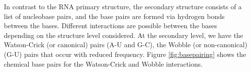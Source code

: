 In contrast to the RNA primary structure, the secondary structure consists of a list of nucleobase pairs, and the base pairs are formed via hydrogen bonds between the bases. Different interactions are possible between the bases depending on the structure level considered. At the secondary level, we have the Watson-Crick (or canonical) pairs \cite{seeman1976rna, rosenberg1976rna} (A-U and G-C), the Wobble (or non-canonical) (G-U) pairs that occur with reduced frequency. Figure \ref{fig:basepairing} shows the chemical base pairs for the Watson-Crick and Wobble interactions. 
\reversemarginpar
\reversemarginpar
{}


